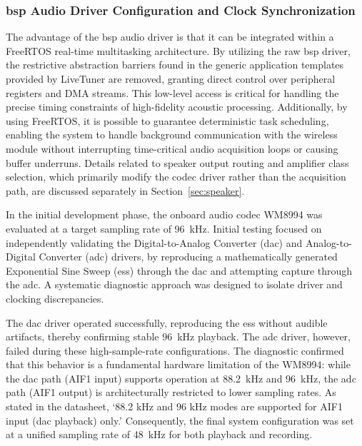 \subsubsection{\acrshort{bsp} Audio Driver Configuration and Clock Synchronization}
\label{sec:bsp_config}

The advantage of the \acrshort{bsp} audio driver is that it can be integrated within a FreeRTOS real-time multitasking architecture. By utilizing the raw \acrshort{bsp} driver, the restrictive abstraction barriers found in the generic application templates provided by LiveTuner are removed, granting direct control over peripheral registers and DMA streams. This low-level access is critical for handling the precise timing constraints of high-fidelity acoustic processing. Additionally, by using FreeRTOS, it is possible to guarantee deterministic task scheduling, enabling the system to handle background communication with the wireless module without interrupting time-critical audio acquisition loops or causing buffer underruns. Details related to speaker output routing and amplifier class selection, which primarily modify the codec driver rather than the acquisition path, are discussed separately in Section~\ref{sec:speaker}.

In the initial development phase, the onboard audio codec WM8994 was evaluated at a target sampling rate of \SI{96}{\kHz}. Initial testing focused on independently validating the Digital-to-Analog Converter (\acrshort{dac}) and Analog-to-Digital Converter (\acrshort{adc}) drivers, by reproducing a mathematically generated Exponential Sine Sweep (\acrshort{ess}) through the \acrshort{dac} and attempting capture through the \acrshort{adc}. A systematic diagnostic approach was designed to isolate driver and clocking discrepancies.

The \acrshort{dac} driver operated successfully, reproducing the \acrshort{ess} without audible artifacts, thereby confirming stable \SI{96}{\kHz} playback. The \acrshort{adc} driver, however, failed during these high-sample-rate configurations. The diagnostic confirmed that this behavior is a fundamental hardware limitation of the WM8994: while the \acrshort{dac} path (AIF1 input) supports operation at 88.2~kHz and 96~kHz, the \acrshort{adc} path (AIF1 output) is architecturally restricted to lower sampling rates. As stated in the datasheet, `88.2 kHz and 96 kHz modes are supported for AIF1 input (\acrshort{dac} playback) only.' Consequently, the final system configuration was set at a unified sampling rate of 48~kHz for both playback and recording.


